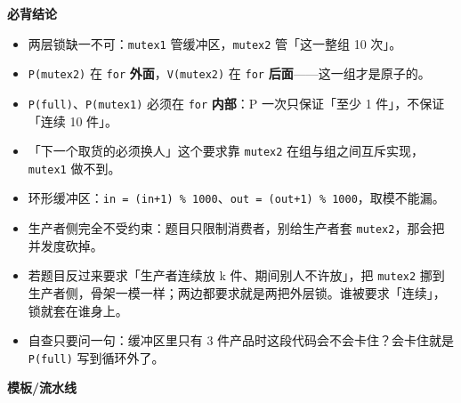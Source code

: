 \documentclass[10pt,a4paper]{ctexart}
\begin{document}



\textbf{必背结论}

\begin{itemize}

\item 两层锁缺一不可：\texttt{mutex1} 管缓冲区，\texttt{mutex2} 管「这一整组 10 次」。

\item \texttt{P(mutex2)} 在 \texttt{for} \textbf{外面}，\texttt{V(mutex2)} 在 \texttt{for} \textbf{后面}——这一组才是原子的。

\item \texttt{P(full)}、\texttt{P(mutex1)} 必须在 \texttt{for} \textbf{内部}：P 一次只保证「至少 1 件」，不保证「连续 10 件」。

\item 「下一个取货的必须换人」这个要求靠 \texttt{mutex2} 在组与组之间互斥实现，\texttt{mutex1} 做不到。

\item 环形缓冲区：\texttt{in = (in+1) \% 1000}、\texttt{out = (out+1) \% 1000}，取模不能漏。

\item 生产者侧完全不受约束：题目只限制消费者，别给生产者套 \texttt{mutex2}，那会把并发度砍掉。

\item 若题目反过来要求「生产者连续放 k 件、期间别人不许放」，把 \texttt{mutex2} 挪到生产者侧，骨架一模一样；两边都要求就是两把外层锁。谁被要求「连续」，锁就套在谁身上。

\item 自查只要问一句：缓冲区里只有 3 件产品时这段代码会不会卡住？会卡住就是 \texttt{P(full)} 写到循环外了。

\end{itemize}

\textbf{模板/流水线}
\end{document}
